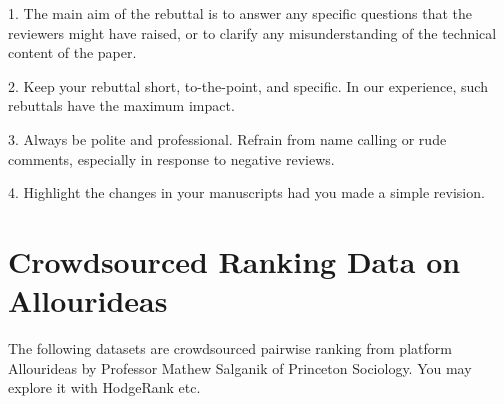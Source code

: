 \documentclass[11pt]{article}
\begin{document}
1. The main aim of the rebuttal is to answer any specific questions that the reviewers might have raised, or to clarify any misunderstanding of the technical content of the paper.

2. Keep your rebuttal short, to-the-point, and specific. In our experience, such rebuttals have the maximum impact.

3. Always be polite and professional. Refrain from name calling or rude comments, especially in response to negative reviews.

4. Highlight the changes in your manuscripts had you made a simple revision.

\newpage

\section{Crowdsourced Ranking Data on Allourideas}
The following datasets are crowdsourced pairwise ranking from platform Allourideas by Professor Mathew Salganik of Princeton Sociology. You may explore it with HodgeRank etc. 

%
%
%
%
%
\end{document}
